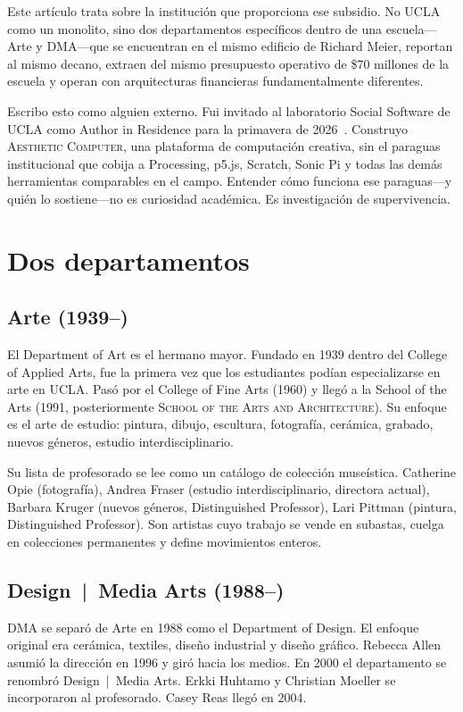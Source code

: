 \documentclass[10pt,letterpaper,twocolumn]{article}
\newcommand{\ac}{\textsc{Aesthetic Computer}}
\newcommand{\dma}{\textsc{DMA}}
\newcommand{\sofa}{\textsc{School of the Arts and Architecture}}
\begin{document}
Este artículo trata sobre la institución que proporciona ese subsidio. No UCLA como un monolito, sino dos departamentos específicos dentro de una escuela---Arte y \dma{}---que se encuentran en el mismo edificio de Richard Meier, reportan al mismo decano, extraen del mismo presupuesto operativo de \$70 millones de la escuela y operan con arquitecturas financieras fundamentalmente diferentes.

Escribo esto como alguien externo. Fui invitado al laboratorio Social Software de UCLA como Author in Residence para la primavera de 2026~\citep{scudder2026ac}. Construyo \ac{}, una plataforma de computación creativa, sin el paraguas institucional que cobija a Processing, p5.js, Scratch, Sonic Pi y todas las demás herramientas comparables en el campo. Entender cómo funciona ese paraguas---y quién lo sostiene---no es curiosidad académica. Es investigación de supervivencia.

\section{Dos departamentos}

\subsection{Arte (1939--)}

El Department of Art es el hermano mayor. Fundado en 1939 dentro del College of Applied Arts, fue la primera vez que los estudiantes podían especializarse en arte en UCLA. Pasó por el College of Fine Arts (1960) y llegó a la School of the Arts (1991, posteriormente \sofa{}). Su enfoque es el arte de estudio: pintura, dibujo, escultura, fotografía, cerámica, grabado, nuevos géneros, estudio interdisciplinario.

Su lista de profesorado se lee como un catálogo de colección museística. Catherine Opie (fotografía), Andrea Fraser (estudio interdisciplinario, directora actual), Barbara Kruger (nuevos géneros, Distinguished Professor), Lari Pittman (pintura, Distinguished Professor). Son artistas cuyo trabajo se vende en subastas, cuelga en colecciones permanentes y define movimientos enteros.

\subsection{Design~|~Media Arts (1988--)}

\dma{} se separó de Arte en 1988 como el Department of Design. El enfoque original era cerámica, textiles, diseño industrial y diseño gráfico. Rebecca Allen asumió la dirección en 1996 y giró hacia los medios. En 2000 el departamento se renombró Design~|~Media Arts. Erkki Huhtamo y Christian Moeller se incorporaron al profesorado. Casey Reas llegó en 2004.
\end{document}
